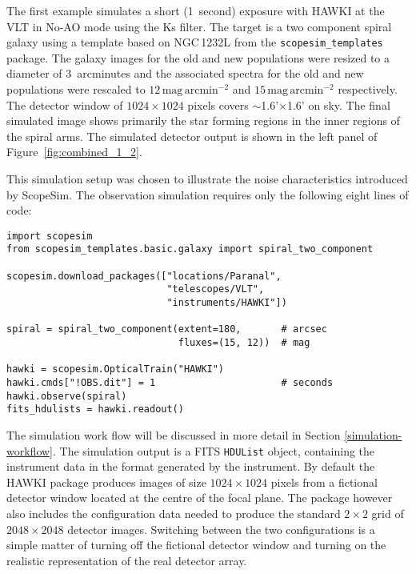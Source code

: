 The first example simulates a short (1~second) exposure with HAWKI \cite{hawki} at the VLT in No-AO mode using the Ks filter.
The target is a two component spiral galaxy using a template based on NGC\,1232L from the \lstinline{scopesim_templates} package.
The galaxy images for the old and new populations were resized to a diameter of 3~arcminutes and the associated spectra for the old and new populations \cite{brown2014} were rescaled to $12\,\mathrm{mag\,arcmin^{-2}}$ and $15\,\mathrm{mag\,arcmin^{-2}}$ respectively.
The detector window of $1024 \times 1024$ pixels covers $\sim$1.6'$\times$1.6' on sky.
The final simulated image shows primarily the star forming regions in the inner regions of the spiral arms.
The simulated detector output is shown in the left panel of Figure~\ref{fig:combined_1_2}.

This simulation setup was chosen to illustrate the noise characteristics introduced by ScopeSim.
The observation simulation requires only the following eight lines of code:

\begin{lstlisting}[frame=single]
import scopesim
from scopesim_templates.basic.galaxy import spiral_two_component

scopesim.download_packages(["locations/Paranal",
                            "telescopes/VLT",
                            "instruments/HAWKI"])

spiral = spiral_two_component(extent=180,       # arcsec
                              fluxes=(15, 12))  # mag

hawki = scopesim.OpticalTrain("HAWKI")
hawki.cmds["!OBS.dit"] = 1                      # seconds
hawki.observe(spiral)
fits_hdulists = hawki.readout()
\end{lstlisting}

The simulation work flow will be discussed in more detail in Section \ref{simulation-workflow}.
The simulation output is a FITS \lstinline{HDUList} object, containing the instrument data in the format generated by the instrument.
By default the HAWKI package produces images of size $1024\times 1024$ pixels from a fictional detector window located at the centre of the focal plane.
The package however also includes the configuration data needed to produce the standard $2\times2$ grid of $2048\times 2048$ detector images.
Switching between the two configurations is a simple matter of turning off the fictional detector window and turning on the realistic representation of the real detector array.



